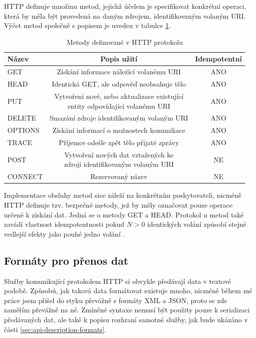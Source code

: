 \documentclass[czech,DP]{thesiskiv}
\begin{document}
HTTP definuje množinu metod, jejichž účelem je specifikovat konkrétní operaci, která by měla být provedená na daným zdrojem, identifikovaným volaným URI. Výčet metod společně s popisem je uveden v tabulce \ref{tab:http-methods}.

\begin{table}[h]
	\centering
	\begin{tabular}{|l|c|c|}
		\hline
		Název & Popis užití & Idempotentní \\
		\hline
		\hline
		GET & Získání informace náležící volanému URI & ANO \\
		\hline
		HEAD & Identická GET, ale odpověď neobsahuje tělo & ANO \\
		\hline
		PUT & \makecell{Vytvoření nové, nebo aktualizace existující \\ entity odpovídající volanému URI }  & ANO \\
		\hline
		DELETE & Smazání zdroje identifikovaným volaným URI & ANO \\
		\hline
		OPTIONS & Získání informací o možnostech komunikace  & ANO \\
		\hline
		TRACE & Příjemce odešle zpět tělo přijaté zprávy & ANO \\
		\hline
		POST & \makecell{Vytvoření nových dat vztažených ke \\ zdroji identifikovaným volaným URI} & NE \\
		\hline
		CONNECT & Rezervovaný název & NE \\
		\hline		
	\end{tabular}
	\caption{Metody definované v HTTP protokolu}
	\label{tab:http-methods}
\end{table}

Implementace obsluhy metod sice záleží na konkrétním poskytovateli, nicméně HTTP definuje tzv. bezpečné metody, jež by měly označovat pouze operace určené k získání dat. Jedná se o metody GET a HEAD. Protokol u metod také zavádí vlastnost idempotentnosti pokud $N>0$ identických volání způsobí stejné vedlejší efekty jako pouhé jedno volání \cite{httpRfc}.


\subsection{Formáty pro přenos dat}

Služby komunikující protokolem HTTP si obvykle předávají data v textové podobě. Způsobů, jak taková data formátovat existuje mnoho, nicméně během mé práce jsem přišel do styku převážně s formáty XML a JSON, proto se zde zaměřím převážně na ně. Zmíněné syntaxe nemusí být použity pouze k serializaci předávaných dat, ale také k popisu rozhraní samotné služby, jak bude ukázáno v části \ref{sec:api-description-formats}.
\end{document}
